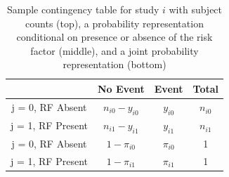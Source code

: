 \documentclass[AMA,STIX1COL]{WileyNJD-v2}
\begin{document}


\clearpage 


\begin{table}[ht]
\centering
\begin{tabular}{c|cc|c}
                           & No Event          & Event       & Total        \\ \hline
j = 0, RF Absent  & $n_{i0} - y_{i0}$ & $y_{i0}$    & $n_{i0}$     \\
j = 1, RF Present & $n_{i1} - y_{i1}$ & $y_{i1}$    & $n_{i1}$     \\ \hline
j = 0, RF Absent & $1 - \pi_{i0}$    & $\pi_{i0}$  & 1            \\
j = 1, RF Present & $1 - \pi_{i1}$    & $\pi_{i1}$  & 1            \\ \hline 
\end{tabular}
\caption{Sample contingency table for study $i$ with subject counts (top), a probability representation conditional on presence or absence of the risk factor (middle), and a joint probability representation (bottom)}
\label{table:RCT_contingency}
\end{table}
\end{document}
